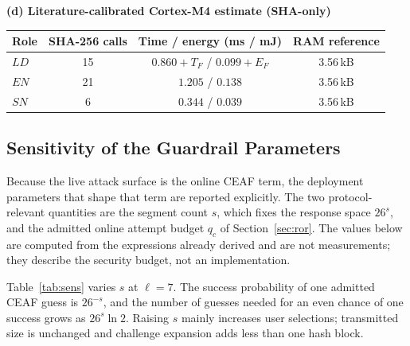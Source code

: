 \documentclass[cmc,article,submit,moreauthors,pdftex]{Definitions/tsp}
\begin{document}
\begin{table}[t]
\smallskip\noindent\textbf{(d) Literature-calibrated Cortex-M4 estimate (SHA-only)}\par\smallskip
\scriptsize
\begin{tabular}{lccc}
\toprule
\textbf{Role} & \textbf{SHA-256 calls} & \textbf{Time / energy (ms / mJ)} & \textbf{RAM reference}\\
\midrule
$LD$ & 15 & $0.860+T_F$ / $0.099+E_F$ & 3.56\,kB\\
$EN$ & 21 & $1.205$ / $0.138$ & 3.56\,kB\\
$SN$ & 6 & $0.344$ / $0.039$ & 3.56\,kB\\
\bottomrule
\end{tabular}\par\smallskip
\normalsize
{}
\end{table}

\subsection{Sensitivity of the Guardrail Parameters}\label{sec:sensitivity}

Because the live attack surface is the online CEAF term, the deployment parameters that shape that term are reported explicitly. The two protocol-relevant quantities are the segment count $s$, which fixes the response space $26^{s}$, and the admitted online attempt budget $q_{c}$ of Section~\ref{sec:ror}. The values below are computed from the expressions already derived and are not measurements; they describe the security budget, not an implementation.

Table~\ref{tab:sens} varies $s$ at $\ell=7$. The success probability of one admitted CEAF guess is $26^{-s}$, and the number of guesses needed for an even chance of one success grows as $26^{s}\ln 2$. Raising $s$ mainly increases user selections; transmitted size is unchanged and challenge expansion adds less than one hash block.
\end{document}
